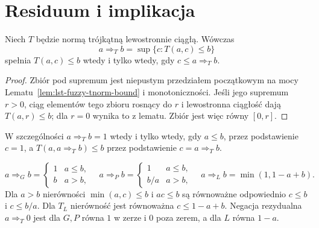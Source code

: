 \section{Residuum i implikacja}
\begin{twierdzenie}\label{thm:lst-fuzzy-residuation}
Niech $T$ będzie normą trójkątną lewostronnie ciągłą. Wówczas
\[
a\Rightarrow_T b=\sup\{c:T(a,c)\leq b\}
\]
spełnia $T(a,c)\leq b$ wtedy i tylko wtedy, gdy $c\leq a\Rightarrow_T b$.
\end{twierdzenie}
\begin{proof}
Zbiór pod supremum jest niepustym przedziałem początkowym na mocy
Lematu~\ref{lem:lst-fuzzy-tnorm-bound} i monotoniczności.
Jeśli jego supremum $r>0$, ciąg elementów tego zbioru rosnący do $r$
i lewostronna ciągłość dają $T(a,r)\leq b$; dla $r=0$ wynika to z lematu.
Zbiór jest więc równy $[0,r]$.
\end{proof}
W szczególności $a\Rightarrow_T b=1$ wtedy i tylko wtedy, gdy $a\leq b$,
przez podstawienie $c=1$, a $T(a,a\Rightarrow_T b)\leq b$ przez
podstawienie $c=a\Rightarrow_T b$.
\begin{przyklad}\label{ex:lst-fuzzy-implications}
\[
a\Rightarrow_G b=\begin{cases}1&a\leq b,\\b&a>b,\end{cases}
\quad
a\Rightarrow_P b=\begin{cases}1&a\leq b,\\b/a&a>b,\end{cases}
\quad
a\Rightarrow_L b=\min(1,1-a+b).
\]
Dla $a>b$ nierówności $\min(a,c)\leq b$ i $ac\leq b$ są
równoważne odpowiednio $c\leq b$ i $c\leq b/a$.
Dla $T_L$ nierówność jest równoważna $c\leq1-a+b$.
Negacja rezydualna $a\Rightarrow_T0$ jest dla $G,P$ równa $1$
w zerze i $0$ poza zerem, a dla $L$ równa $1-a$.
\end{przyklad}

